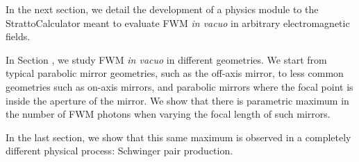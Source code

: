 \documentclass[11pt,SymmetricalJury]{inrsthesis/inrsthesis}
\begin{document}
\begin{description}
  In the next section, we detail the development of a physics module to the
  StrattoCalculator meant to evaluate FWM \textit{in vacuo} in arbitrary
  electromagnetic fields.

  In Section {}, we study FWM \textit{in vacuo} in different geometries. We start
  from typical parabolic mirror geometries, such as the off-axis mirror, to
  less common geometries such as on-axis mirrors, and parabolic mirrors where the
  focal point is inside the aperture of the mirror. We show that there is parametric
  maximum in the number of FWM photons when varying the focal length of such mirrors.

  In the last section, we show that this same maximum is observed in a completely
  different physical process: Schwinger pair production.

\end{description}


\end{document}
